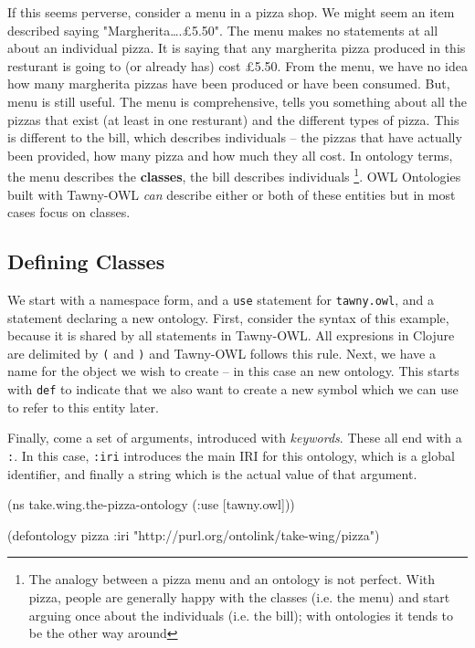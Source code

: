 \documentclass[11pt]{article}
\begin{document}
If this seems perverse, consider a menu in a pizza shop. We might seem
an item described saying "Margherita\ldots{}.£5.50". The menu makes no
statements at all about an individual pizza. It is saying that any
margherita pizza produced in this resturant is going to (or already has)
cost £5.50. From the menu, we have no idea how many margherita pizzas
have been produced or have been consumed. But, menu is still useful. The
menu is comprehensive, tells you something about all the pizzas that
exist (at least in one resturant) and the different types of pizza. This
is different to the bill, which describes individuals -- the pizzas that
have actually been provided, how many pizza and how much they all cost.
In ontology terms, the menu describes the \textbf{classes}, the bill describes
individuals \footnote{The analogy between a pizza menu and an ontology
is not perfect. With pizza, people are generally happy with the classes
(i.e. the menu) and start arguing once about the individuals (i.e. the
bill); with ontologies it tends to be the other way around}. OWL
Ontologies built with Tawny-OWL \emph{can} describe either or both of these
entities but in most cases focus on classes.


\subsection{Defining Classes}
\label{sec-5-1}

We start with a namespace form, and a \verb~use~ statement for \verb~tawny.owl~,
and a statement declaring a new ontology. First, consider the syntax of
this example, because it is shared by all statements in Tawny-OWL. All
expresions in Clojure are delimited by \verb~(~ and \verb~)~ and Tawny-OWL follows
this rule. Next, we have a name for the object we wish to create -- in
this case an new ontology. This starts with \verb~def~ to indicate that we
also want to create a new symbol which we can use to refer to this
entity later.

Finally, come a set of arguments, introduced with \emph{keywords}. These all
end with a \verb~:~. In this case, \verb~:iri~ introduces the main IRI for this
ontology, which is a global identifier, and finally a string which is
the actual value of that argument.

\begin{tawny}
(ns take.wing.the-pizza-ontology (:use [tawny.owl]))

(defontology pizza :iri "http://purl.org/ontolink/take-wing/pizza")
\end{tawny}
\end{document}
